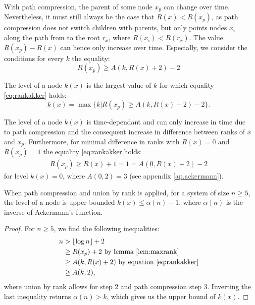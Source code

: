 With path compression, the parent of some node $x_p$ can change over time. Nevertheless, it must still always be the case that $R(x)<R(x_p)$, as path compression does not switch children with parents, but only points nodes $x_i$ along the path from to the root $r_x$, where $R(x_i)<R(r_x)$. The value $R(x_p) - R(x)$ can hence only increase over time. Especially, we consider the conditions for every $k$ the equality:
\begin{equation}\label{eq:rankakker}
  R(x_p)\geq A(k,R(x)+2)-2
\end{equation}
\begin{definition}
  The level of a node $k(x)$ is the largest value of $k$ for which equality \ref{eq:rankakker} holds: 
  \begin{equation}
    k(x) = \max \{ k |  R(x_p)\geq A(k,R(x)+2)-2\}.
  \end{equation}
\end{definition}
The level of a node $k(x)$ is time-dependant and can only increase in time due to path compression and the consequent increase in difference between ranks of $x$ and $x_p$. Furthermore, for minimal difference in ranks with $R(x) = 0$ and $R(x_p)=1$ the equality \ref{eq:rankakker}holds:
\begin{eqnarray*}
  R(x_p) \geq R(x) + 1 = 1 = A(0,R(x) + 2)-2
\end{eqnarray*}
for level $k(x) = 0$, where $A(0,2)=3$ (see appendix \ref{ap.ackermann}).
\begin{lemma}
  When path compression and union by rank is applied, for a system of size $n\geq 5$, the level of a node is upper bounded $k(x) \leq \alpha(n) -1$, where $\alpha(n)$ is the inverse of Ackermann's function. 
\end{lemma}
\begin{proof}
  For $n\geq 5$, we find the following inequalities:
  \begin{align*}
    n &> \lfloor \log n \rfloor + 2 \\
    &\geq R(x_p) + 2 \text{ by lemma \ref{lem:maxrank}}\\
    &\geq A(k,R(x)+2) \text{ by equation \ref{eq:rankakker}}\\
    &\geq A(k,2),
  \end{align*}
  where union by rank allows for step 2 and path compression step 3. Inverting the last inequality returns $\alpha(n) > k$, which gives us the upper bound of $k(x)$. 
\end{proof}






